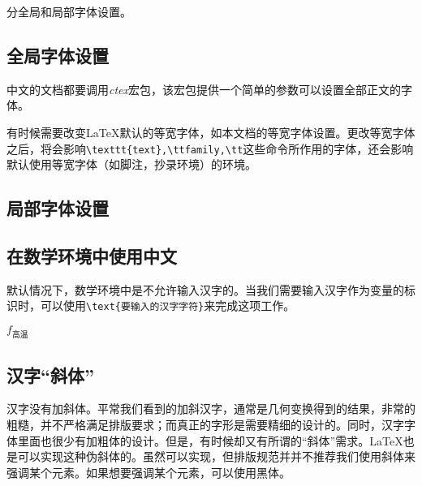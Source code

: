 分全局和局部字体设置。
\subsection{全局字体设置}
中文的文档都要调用\emph{ctex}宏包，该宏包提供一个简单的参数可以设置全部正文的字体。

\begin{latex}
\setmainfont{Times New Roman}	%
\end{latex}

有时候需要改变\LaTeX 默认的等宽字体，如本文档的等宽字体设置。更改等宽字体之后，将会影响\verb|\texttt{text},\ttfamily,\tt|这些命令所作用的字体，还会影响默认使用等宽字体（如脚注，抄录环境）的环境。

\begin{latex}
\setmonofont{Source Code Pro}	%
\end{latex}

\subsection{局部字体设置}

\begin{latex}
\newfontfamily{}	%
\end{latex}

\subsection{在数学环境中使用中文}
默认情况下，数学环境中是不允许输入汉字的。当我们需要输入汉字作为变量的标识时，可以使用\verb|\text{要输入的汉字字符}|来完成这项工作。

\begin{codeshow}
$f_{\text{高温}}$
\end{codeshow}

\subsection{汉字“斜体”}
汉字没有加斜体。平常我们看到的加斜汉字，通常是几何变换得到的结果，非常的粗糙，并不严格满足排版要求；而真正的字形是需要精细的设计的。同时，汉字字体里面也很少有加粗体的设计。但是，有时候却又有所谓的“斜体”需求。\LaTeX 也是可以实现这种伪斜体的。虽然可以实现，但排版规范并并不推荐我们使用斜体来强调某个元素。如果想要强调某个元素，可以使用{\heiti 黑体}。

